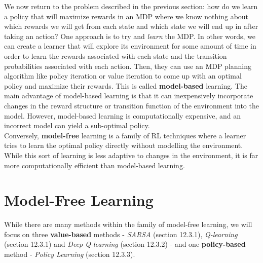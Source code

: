 We now return to the problem described in the previous section: how do we learn a policy that will maximize rewards in an MDP where we know nothing about which rewards we will get from each state and which state we will end up in after taking an action? One approach is to try and \textit{learn} the MDP. In other words, we can create a learner that will explore its environment for some amount of time in order to learn the rewards associated with each state and the transition probabilities associated with each action. Then, they can use an MDP planning algorithm like policy iteration or value iteration to come up with an optimal policy and maximize their rewards. This is called \textbf{model-based} learning. The main advantage of model-based learning is that it can inexpensively incorporate changes in the reward structure or transition function of the environment into the model. However, model-based learning is computationally expensive, and an incorrect model can yield a sub-optimal policy.\\

Conversely, \textbf{model-free} learning is a family of RL techniques where a learner tries to learn the optimal policy directly without modelling the environment. While this sort of learning is less adaptive to changes in the environment, it is far more computationally efficient than model-based learning.\\

\section{Model-Free Learning}
While there are many methods within the family of model-free learning, we will focus on three \textbf{value-based} methods - \textit{SARSA} (section 12.3.1), \textit{Q-learning} (section 12.3.1) and \textit{Deep Q-learning} (section 12.3.2) - and one \textbf{policy-based} method - \textit{Policy Learning} (section 12.3.3). \\

